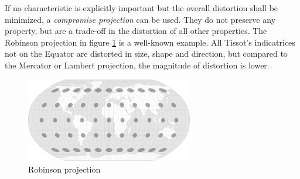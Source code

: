 If no characteristic is explicitly important but the overall distortion shall be minimized, a \emph{compromise projection} can be used. They do not preserve any property, but are a trade-off in the distortion of all other properties. The Robinson projection in figure \ref{fig:robinson_projection} is a well-known example. All Tissot's indicatrices not on the Equator are distorted in size, shape and direction, but compared to the Mercator or Lambert projection, the magnitude of distortion is lower.

\begin{figure}[ht]
  \centering
  \includegraphics[width=0.65\textwidth]{graphics/basics/projection_distortion_robinson.png}
  \caption{Robinson projection \protect\footnotemark}
  \label{fig:robinson_projection}
\end{figure}

